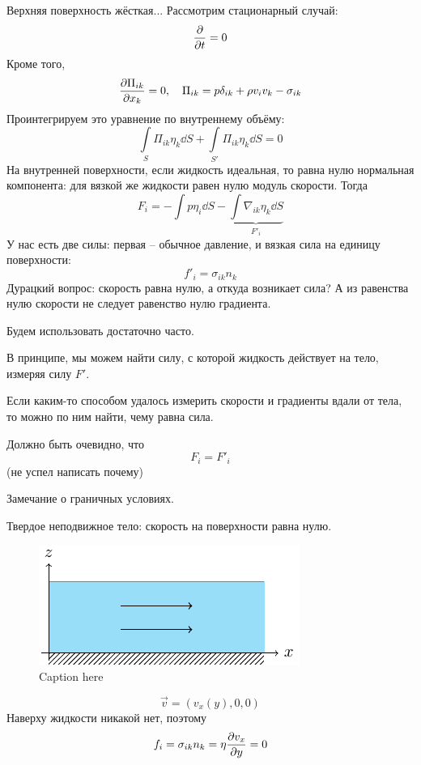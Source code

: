 Верхняя поверхность жёсткая... Рассмотрим стационарный случай:
\begin{equation}
    \pdv{t} = 0
\end{equation}
Кроме того,
\begin{equation}
    \pdv{\Pi_{ik}}{x_k} = 0,\quad
    \Pi_{ik} = p\delta_{ik}+\rho v_i v_k -\sigma_{ik}
\end{equation}
Проинтегрируем это уравнение по внутреннему объёму:
\begin{equation}
    \int\limits_S \Pi_{ik} \eta_k \dd{S} + \int\limits_{S'} \Pi_{ik} \eta_k \dd{S} = 0
\end{equation}
На внутренней поверхности, если жидкость идеальная, то равна нулю нормальная компонента: для вязкой же жидкости равен нулю модуль скорости. Тогда
\begin{equation}
    F_i = -\int p \eta_i \dd{S} - \underbrace{\int \nabla_{ik} \eta_k \dd{S}}_{F'_i}
\end{equation}
У нас есть две силы: первая -- обычное давление, и вязкая сила на единицу поверхности:
\begin{equation}
    f'_i = \sigma_{ik} n_k
\end{equation}
Дурацкий вопрос: скорость равна нулю, а откуда возникает сила? А из равенства нулю скорости не следует равенство нулю градиента.

Будем использовать достаточно часто.

В принципе, мы можем найти силу, с которой жидкость действует на тело, измеряя силу $F'$.

Если каким-то способом удалось измерить скорости и градиенты вдали от тела, то можно по ним найти, чему равна сила.

Должно быть очевидно, что
\begin{equation}
    F_i = F'_i
\end{equation}
(не успел написать почему)

Замечание о граничных условиях.

Твердое неподвижное тело: скорость на поверхности равна нулю.

\begin{figure}[h!]
    \centering
    \includegraphics[scale=1.5]{img/tv}
    \caption{Caption here}
    \label{fig:figure1}
\end{figure}
\begin{equation}
    \vec{v}= (v_x (y),0,0)
\end{equation}
Наверху жидкости никакой нет, поэтому
\begin{equation}
    f_i = \sigma_{ik} n_k =
    \eta\pdv{v_x}{y} = 0
\end{equation}

